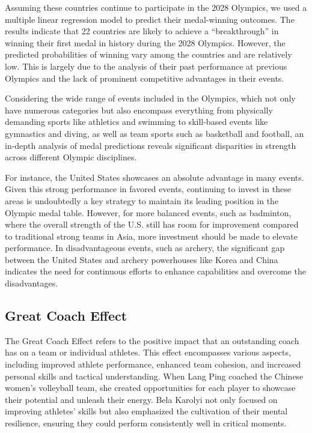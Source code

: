 \documentclass{mcmthesis}
\begin{document}
Assuming these countries continue to participate in the 2028 Olympics, we used a multiple linear regression model to predict their medal-winning outcomes. The results indicate that 22 countries are likely to achieve a “breakthrough” in winning their first medal in history during the 2028 Olympics. However, the predicted probabilities of winning vary among the countries and are relatively low. This is largely due to the analysis of their past performance at previous Olympics and the lack of prominent competitive advantages in their events.

Considering the wide range of events included in the Olympics, which not only have numerous categories but also encompass everything from physically demanding sports like athletics and swimming to skill-based events like gymnastics and diving, as well as team sports such as basketball and football, an in-depth analysis of medal predictions reveals significant disparities in strength across different Olympic disciplines.

For instance, the United States showcases an absolute advantage in many events. Given this strong performance in favored events, continuing to invest in these areas is undoubtedly a key strategy to maintain its leading position in the Olympic medal table. However, for more balanced events, such as badminton, where the overall strength of the U.S. still has room for improvement compared to traditional strong teams in Asia, more investment should be made to elevate performance. In disadvantageous events, such as archery, the significant gap between the United States and archery powerhouses like Korea and China indicates the need for continuous efforts to enhance capabilities and overcome the disadvantages.

\subsection{Great Coach Effect}

The Great Coach Effect refers to the positive impact that an outstanding coach has on a team or individual athletes. This effect encompasses various aspects, including improved athlete performance, enhanced team cohesion, and increased personal skills and tactical understanding. When Lang Ping coached the Chinese women's volleyball team, she created opportunities for each player to showcase their potential and unleash their energy. Bela Karolyi not only focused on improving athletes' skills but also emphasized the cultivation of their mental resilience, ensuring they could perform consistently well in critical moments.
\end{document}

